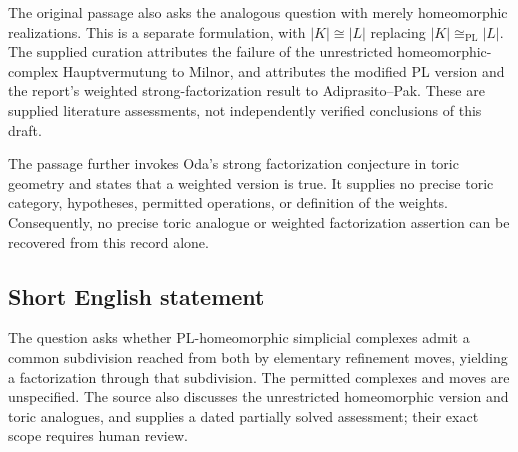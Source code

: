 \documentclass[11pt]{article}
\begin{document}
The original passage also asks the analogous question with merely homeomorphic realizations. This is a separate formulation, with \(|K|\cong|L|\) replacing \(|K|\cong_{\mathrm{PL}}|L|\). The supplied curation attributes the failure of the unrestricted homeomorphic-complex Hauptvermutung to Milnor, and attributes the modified PL version and the report's weighted strong-factorization result to Adiprasito--Pak. These are supplied literature assessments, not independently verified conclusions of this draft.

The passage further invokes Oda's strong factorization conjecture in toric geometry and states that a weighted version is true. It supplies no precise toric category, hypotheses, permitted operations, or definition of the weights. Consequently, no precise toric analogue or weighted factorization assertion can be recovered from this record alone.
\subsection{Short English statement}
The question asks whether PL-homeomorphic simplicial complexes admit a common subdivision reached from both by elementary refinement moves, yielding a factorization through that subdivision. The permitted complexes and moves are unspecified. The source also discusses the unrestricted homeomorphic version and toric analogues, and supplies a dated partially solved assessment; their exact scope requires human review.
\end{document}
